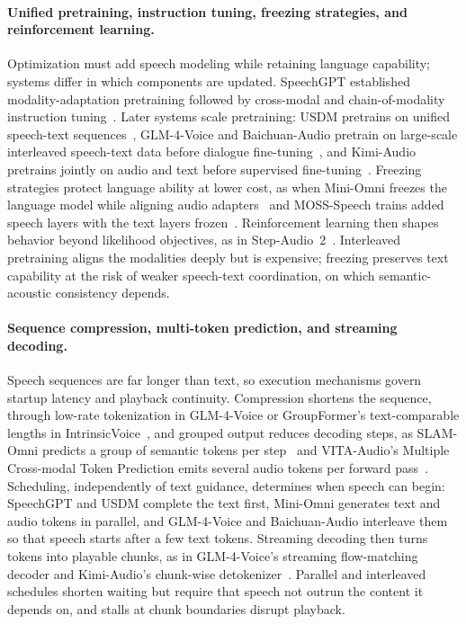 \paragraph{Unified pretraining, instruction tuning, freezing strategies, and reinforcement learning.}
Optimization must add speech modeling while retaining language capability; systems differ in which components are updated. SpeechGPT established modality-adaptation pretraining followed by cross-modal and chain-of-modality instruction tuning~\citep{DBLP:conf/emnlp/ZhangLZZWZQ23}. Later systems scale pretraining: USDM pretrains on unified speech-text sequences~\citep{DBLP:conf/nips/KimSJKKKLSOHYY24}, GLM-4-Voice and Baichuan-Audio pretrain on large-scale interleaved speech-text data before dialogue fine-tuning~\citep{DBLP:journals/corr/abs-2412-02612,DBLP:journals/corr/abs-2502-17239}, and Kimi-Audio pretrains jointly on audio and text before supervised fine-tuning~\citep{DBLP:journals/corr/abs-2504-18425}. Freezing strategies protect language ability at lower cost, as when Mini-Omni freezes the language model while aligning audio adapters~\citep{DBLP:journals/corr/abs-2408-16725} and MOSS-Speech trains added speech layers with the text layers frozen~\citep{DBLP:conf/iclr/ZhaoXJWCJCLCWZC26}. Reinforcement learning then shapes behavior beyond likelihood objectives, as in Step-Audio~2~\citep{DBLP:journals/corr/abs-2507-16632}. Interleaved pretraining aligns the modalities deeply but is expensive; freezing preserves text capability at the risk of weaker speech-text coordination, on which semantic-acoustic consistency depends.

\paragraph{Sequence compression, multi-token prediction, and streaming decoding.}
Speech sequences are far longer than text, so execution mechanisms govern startup latency and playback continuity. Compression shortens the sequence, through low-rate tokenization in GLM-4-Voice or GroupFormer's text-comparable lengths in IntrinsicVoice~\citep{DBLP:journals/corr/abs-2412-02612,DBLP:journals/corr/abs-2410-08035}, and grouped output reduces decoding steps, as SLAM-Omni predicts a group of semantic tokens per step~\citep{DBLP:conf/acl/Chen0YLLXN00L0025} and VITA-Audio's Multiple Cross-modal Token Prediction emits several audio tokens per forward pass~\citep{DBLP:journals/corr/abs-2505-03739}. Scheduling, independently of text guidance, determines when speech can begin: SpeechGPT and USDM complete the text first, Mini-Omni generates text and audio tokens in parallel, and GLM-4-Voice and Baichuan-Audio interleave them so that speech starts after a few text tokens. Streaming decoding then turns tokens into playable chunks, as in GLM-4-Voice's streaming flow-matching decoder and Kimi-Audio's chunk-wise detokenizer~\citep{DBLP:journals/corr/abs-2504-18425}. Parallel and interleaved schedules shorten waiting but require that speech not outrun the content it depends on, and stalls at chunk boundaries disrupt playback.

